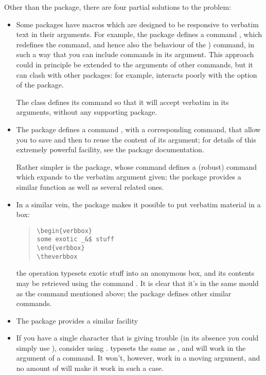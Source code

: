 Other than the  package, there are four partial
solutions to the problem:
\begin{itemize}
\item Some packages have macros which are designed to be responsive
  to verbatim text in their arguments.  For example,
  the  package defines a command
  , which redefines the 
  command, and hence also the behaviour of the )
  command, in such a way that you can include  commands in
  its argument.  This approach could in principle be extended to the
  arguments of other commands, but it can clash with other packages:
  for example,  interacts poorly with the
   option of the  package.

  The  class defines its  command so that
  it will accept verbatim in its arguments, without any supporting package.
\item The  package defines a command ,
  with a corresponding  command, that allow you to save
  and then to reuse the content of its argument; for details of this
  extremely powerful facility, see the package documentation.

  Rather simpler is the  package, whose 
  command defines a (robust) command which expands to the verbatim
  argument given; the  package provides a similar
  function as well as several related ones.
\item In a similar vein, the  package makes it
  possible to put verbatim material in a box:
  \begin{quote}
\begin{verbatim}
\begin{verbbox}
some exotic _&$ stuff
\end{verbbox}
\theverbbox
\end{verbatim}
  \end{quote}
  the operation typesets exotic stuff into an anonymous box, and its
  contents may be retrieved using the command .  It is
  clear that it's in the same mould as the  command
  mentioned above; the package defines other similar commands.
\item The  package provides a similar facility
\item If you have a single character that is giving trouble (in
  its absence you could simply use ), consider using
  .  
  typesets the same as 
  , and will work in the argument of a command.  It
  won't, however, work in a moving argument, and no amount of
   will make it work in
  such a case.


\end{itemize}
